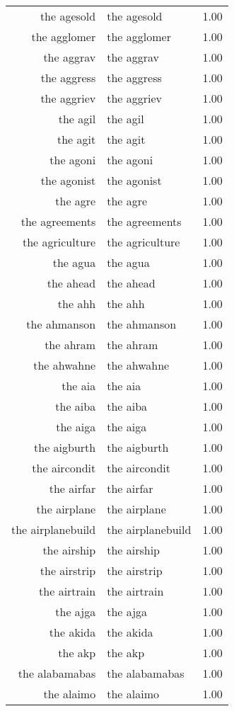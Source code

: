 \begin{table}[ht]
\begin{tabular}{rlr}
  the agesold & the agesold & 1.00 \\ 
  the agglomer & the agglomer & 1.00 \\ 
  the aggrav & the aggrav & 1.00 \\ 
  the aggress & the aggress & 1.00 \\ 
  the aggriev & the aggriev & 1.00 \\ 
  the agil & the agil & 1.00 \\ 
  the agit & the agit & 1.00 \\ 
  the agoni & the agoni & 1.00 \\ 
  the agonist & the agonist & 1.00 \\ 
  the agre & the agre & 1.00 \\ 
  the agreements & the agreements & 1.00 \\ 
  the agriculture & the agriculture & 1.00 \\ 
  the agua & the agua & 1.00 \\ 
  the ahead & the ahead & 1.00 \\ 
  the ahh & the ahh & 1.00 \\ 
  the ahmanson & the ahmanson & 1.00 \\ 
  the ahram & the ahram & 1.00 \\ 
  the ahwahne & the ahwahne & 1.00 \\ 
  the aia & the aia & 1.00 \\ 
  the aiba & the aiba & 1.00 \\ 
  the aiga & the aiga & 1.00 \\ 
  the aigburth & the aigburth & 1.00 \\ 
  the aircondit & the aircondit & 1.00 \\ 
  the airfar & the airfar & 1.00 \\ 
  the airplane & the airplane & 1.00 \\ 
  the airplanebuild & the airplanebuild & 1.00 \\ 
  the airship & the airship & 1.00 \\ 
  the airstrip & the airstrip & 1.00 \\ 
  the airtrain & the airtrain & 1.00 \\ 
  the ajga & the ajga & 1.00 \\ 
  the akida & the akida & 1.00 \\ 
  the akp & the akp & 1.00 \\ 
  the alabamabas & the alabamabas & 1.00 \\ 
  the alaimo & the alaimo & 1.00 \\ 

\end{tabular}
\end{table}
